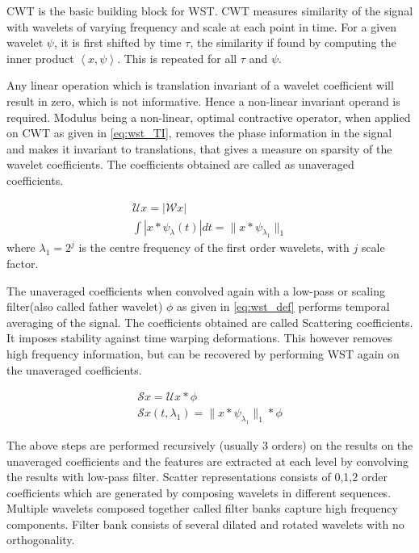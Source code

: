 CWT is the basic building block for WST. CWT measures similarity of the signal with wavelets of varying frequency and scale at each point in time. For a given wavelet $\psi$, it is first shifted by time $\tau$, the similarity if found by computing the inner product $\left\langle x, \psi \right\rangle$. This is repeated for all $\tau$ and $\psi$.

Any linear operation which is translation invariant of a wavelet coefficient will result in zero, which is not informative. Hence a non-linear invariant operand is required. Modulus being a non-linear, optimal contractive operator, when applied on CWT as given in \ref{eq:wst_TI}, removes the phase information in the signal and makes it invariant to translations, that gives a measure on sparsity of the wavelet coefficients. The coefficients obtained are called as unaveraged coefficients. 

\begin{equation} \label{eq:wst_TI}
    \begin{split}
     \mathcal{U} x = |\mathcal{W} x|\\
     \int | x \ast \psi_\lambda(t) | dt = \| x \ast \psi_{\lambda_{1}}\|_1 
    \end{split}
\end{equation}
where $\lambda_1 = 2^j$ is the centre frequency of the first order wavelets, with $j$ scale factor.

The unaveraged coefficients when convolved again with a low-pass or scaling filter(also called father wavelet) $\phi$ as given in \ref{eq:wst_def} performs temporal averaging of the signal. The coefficients obtained are called Scattering coefficients. It imposes stability against time warping deformations. This however removes high frequency information, but can be recovered by performing WST again on the unaveraged coefficients.

\begin{equation} \label{eq:wst_def}
    \begin{split}
        \mathcal{S} x = \mathcal{U} x \ast \phi\\
        \mathcal{S} x(t, \lambda_1) = \| x \ast \psi_{\lambda_{1}}\|_1 \ast \phi         
    \end{split}
\end{equation}

The above steps are performed recursively (usually 3 orders) on the results on the unaveraged coefficients and the features are extracted at each level by convolving the results with low-pass filter. Scatter representations consists of {0,1,2} order coefficients which are generated by composing wavelets in different sequences. Multiple wavelets composed together called filter banks capture high frequency components. Filter bank consists of several dilated and rotated wavelets with no orthogonality.

